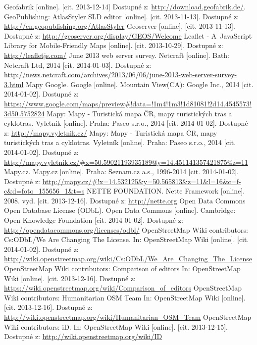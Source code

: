 \documentclass[11pt,a4paper,titlepage,oneside]{book}
\begin{document}
\begin{thebibliography}{99}
	Geofabrik [online]. [cit. 2013-12-14] Dostupné z: \url{http://download.geofabrik.de/}.
	GeoPublishing: AtlasStyler SLD editor [online]. [cit. 2013-11-13]. Dostupné z: \url{http://en.geopublishing.org/AtlasStyler}
	Geoserver [online]. [cit. 2013-11-13]. Dostupné z: \url{http://geoserver.org/display/GEOS/Welcome}
		Leaflet - A~JavaScript Library for Mobile-Friendly Maps [online]. [cit. 2013-10-29]. Dostupné z: \url{http://leafletjs.com/}
	June 2013 web server survey. Netcraft [online]. Bath: Netcraft Ltd, 2014 [cit. 2014-01-03]. Dostupné z: \url{http://news.netcraft.com/archives/2013/06/06/june-2013-web-server-survey-3.html}
	Mapy Google. Google [online]. Mountain View(CA): Google Inc., 2014 [cit. 2014-01-02]. Dostupné z: \url{https://www.google.com/maps/preview#!data=!1m4!1m3!1d81081!2d14.4545573!3d50.5752824}
	Mapy: Mapy - Turistická mapa ČR, mapy turistických tras a cyklotras. Vyletník [online]. Praha: Paseo s.r.o., 2014 [cit. 2014-01-02]. Dostupné z: \url{http://mapy.vyletnik.cz/}
	Mapy: Mapy - Turistická mapa ČR, mapy turistických tras a cyklotras. Vyletník [online]. Praha: Paseo s.r.o., 2014 [cit. 2014-01-02]. Dostupné z: \url{http://mapy.vyletnik.cz/#x=50.59021193935189@y=14.451141357421875@z=11}
	Mapy.cz. Mapy.cz [online]. Praha: Seznam.cz a.s., 1996-2014 [cit. 2014-01-02]. Dostupné z: \url{http://mapy.cz/#!x=14.532125&y=50.565813&z=11&l=16&c=f-c&d=foto_155656_1&t=s}	
	NETTE FOUNDATION. Nette Framework [online]. 2008. vyd. [cit. 2013-12-16]. Dostupné z: \url{http://nette.org} 
	Open Data Commons Open Database License (ODbL). Open Data Commons [online]. Cambridge: Open Knowledge Foundation [cit. 2014-01-02]. Dostupné z: \url{http://opendatacommons.org/licenses/odbl/}		
	OpenStreetMap Wiki contributors: Cs:ODbL/We Are Changing The License. In: OpenStreetMap Wiki [online]. [cit. 2014-01-02]. Dostupné z: \url{http://wiki.openstreetmap.org/wiki/Cs:ODbL/We_Are_Changing_The_License}
	OpenStreetMap Wiki contributors: Comparison of editors In: OpenStreetMap Wiki [online]. [cit. 2013-12-16]. Dostupné z:	\url{https://wiki.openstreetmap.org/wiki/Comparison_of_editors}
	OpenStreetMap Wiki contributors: Humanitarian OSM Team  In: OpenStreetMap Wiki [online]. [cit. 2013-12-16]. Dostupné z: \url{http://wiki.openstreetmap.org/wiki/Humanitarian_OSM_Team}
	OpenStreetMap Wiki contributors: iD. In: OpenStreetMap Wiki [online]. [cit. 2013-12-15]. Dostupné z:  \url{http://wiki.openstreetmap.org/wiki/ID}

\end{thebibliography}
\end{document}
